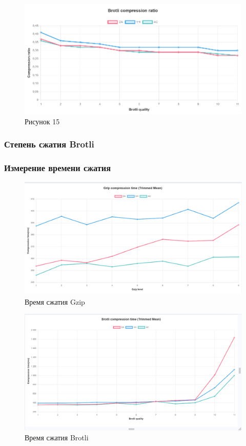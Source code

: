 \documentclass[12pt]{article}
\begin{document}
\begin{figure}[H]
    \centering
    \includegraphics[width=1\textwidth]{../images/brotli_compressed_ratio.png}
    \caption{Рисунок 15}
\end{figure}

\subsubsection{Степень сжатия Brotli}

\subsubsection{Измерение времени сжатия}

\begin{figure}[H]
    \centering
    \includegraphics[width=1\textwidth]{../images/Gzip compression time (Trimmed Mean).png}
    \caption{Время сжатия Gzip}
\end{figure}

\begin{figure}[H]
    \centering
    \includegraphics[width=1\textwidth]{../images/Brotli compression time (Trimmed Mean).png}
    \caption{Время сжатия Brotli}
\end{figure}
\end{document}
